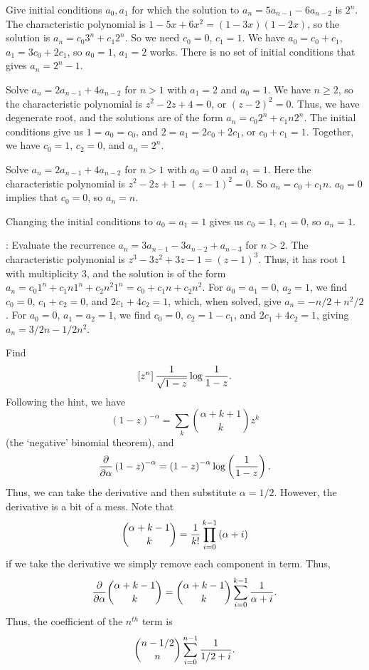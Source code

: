 \vskip 0.08in  Give initial conditions $a_0, a_1$
for which the solution to $a_n = 5 a_{n-1} - 6 a_{n-2}$ is $2^n$.\hfil\break
The characteristic polynomial is $1 - 5 x + 6 x^2 = \left(1 - 3 x\right)
\left(1 - 2 x \right)$, so the solution is $a_n = c_0 3^n + c_1 2^n$.
So we need $c_0 = 0$, $c_1 = 1$.  We have $a_0 = c_0 + c_1$,
$a_1 = 3 c_0 + 2 c_1$, so $a_0 = 1$, $a_1 = 2$ works.
There is no set of initial conditions that gives $a_n = 2^n - 1$.

\vskip 0.08in  Solve $a_n = 2 a_{n-1}  + 4 a_{n-2}$
for $n > 1$ with $a_1=2$ and $a_0 = 1$.\hfil\break
We have $n \ge 2$, so the characteristic polynomial is $z^2 - 2 z + 4 = 0$,
or $\left(z -2\right)^2 = 0$.  Thus, we have degenerate root, and the solutions
are of the form $a_n = c_0 2^n + c_1 n 2^n$.  The initial conditions give us
$1 = a_0 = c_0$, and $2 = a_1 = 2 c_0 + 2 c_1$, or $c_0 + c_1 = 1$.
Together, we have $c_0 = 1$, $c_2 = 0$, and $a_n = 2^n$.

\vskip 0.08in  Solve $a_n = 2 a_{n-1} + 4 a_{n-2}$
for $n > 1$ with $a_0 = 0$ and $a_1 = 1$.\hfil\break
Here the characteristic polynomial is $z^2 - 2 z + 1 = \left(z - 1\right)^2 = 0$.
So $a_n = c_0 + c_1 n$.  $a_0 = 0$ implies that $c_0 = 0$, so
$a_n = n$.  

Changing the initial conditions to $a_0 = a_1 = 1$ gives us
$c_0 = 1$, $c_1 = 0$, so $a_n = 1$.

\vskip 0.08in : Evaluate the
recurrence $a_n = 3 a_{n-1} - 3 a_{n-2} + a_{n-3}$ for $n > 2$.\hfil\break
The characteristic polymonial is $z^3 - 3 z^2 + 3 z - 1 = \left(z - 1\right)^3$.
Thus, it has root 1 with multiplicity 3, and the solution is of the form
$a_n = c_0 1^n + c_1 n 1^n + c_2 n^2 1^n = c_0 + c_1 n + c_2 n^2$.
For $a_0 = a_1 = 0$, $a_2 = 1$, we find $c_0 = 0$, $c_1 + c_2 = 0$,
and $2 c_1 + 4 c_2 = 1$, which, when solved, give $a_n = -n / 2 + n^2/2$.
For $a_0 = 0$, $a_1 = a_2 = 1$, we find $c_0 = 0$, $c_2 = 1 - c_1$,
and $2 c_1 + 4 c_2 = 1$, giving $a_n = 3/2 n - 1/2 n^2$.

\vskip 0.08in  Find
$$
 \left[z^n\right] {1 \over \sqrt{1 - z}} \log {1 \over 1 - z}.
$$
Following the hint, we
have
$$
 \left(1 - z\right)^{-\alpha} = \sum_k {\alpha + k + 1 \choose k} z^k
$$
(the `negative' binomial theorem), and
$$
 {\partial \over \partial \alpha} \left(1 - z \right)^{-\alpha}
  = \left(1 - z\right)^{-\alpha} \log \left({1 \over 1 - z}\right).
$$
Thus, we can take the derivative and then substitute $\alpha = 1/2$.
However, the derivative is a bit of a mess.  Note that
$$
  {\alpha + k - 1 \choose k} = {1 \over k!} \prod_{i=0}^{k-1} \left(\alpha + i\right)
$$
if we take the derivative we simply remove each component in term.  Thus,
$$
 {\partial \over \partial \alpha} {\alpha + k - 1 \choose k} =
  {\alpha + k - 1 \choose k} \sum_{i=0}^{k-1} {1 \over \alpha + i}.
$$
Thus, the coefficient of the $n^{th}$ term is
$$
 {n - 1/2 \choose n} \sum_{i=0}^{n-1} {1 \over 1/2 + i}.
$$

